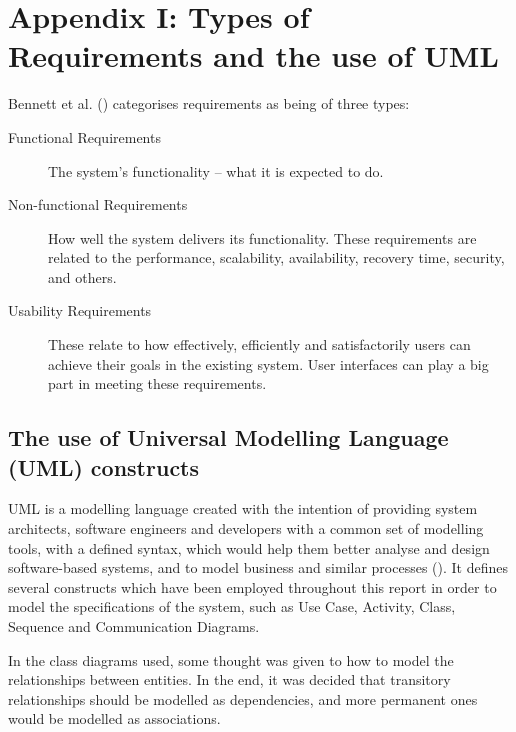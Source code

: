 \section{Appendix I: Types of Requirements and the use of UML} \label{appendix1}

Bennett et al.
(\citeyear[][pp.~140-142]{bennett2010object}) categorises requirements as being
of three types:

\begin{description} \item[Functional Requirements]
    The system's functionality -- what it is expected to do.
    
  \item[Non-functional Requirements]
    How well the system delivers its functionality. These requirements are
    related to the performance, scalability, availability, recovery time,
    security, and others.

  \item[Usability Requirements]
    These relate to how effectively, efficiently and satisfactorily users can
    achieve their goals in the existing system. User interfaces can play a big
    part in meeting these requirements.
\end{description}

\subsection{The use of Universal Modelling Language (UML) constructs}
\label{sec:Introduction.methodology.uml}

UML is a modelling language created with the intention of providing system
architects, software engineers and developers with a common set of modelling
tools, with a defined syntax, which would help them better analyse and design
software-based systems, and to model business and similar processes
(\cite[][p.~43]{omg2015uml}). It defines several constructs which have been
employed throughout this report in order to model the specifications of the
system, such as Use Case, Activity, Class, Sequence and Communication Diagrams.  

In the class diagrams used, some thought was given to how to model the
relationships between entities. In the end, it was decided that transitory
relationships should be modelled as dependencies, and more permanent ones would
be modelled as associations.

